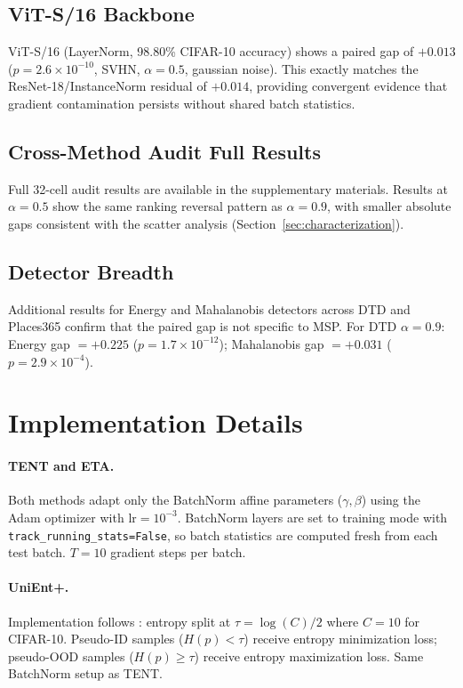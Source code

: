 \subsection{ViT-S/16 Backbone}

ViT-S/16 (LayerNorm, 98.80\% CIFAR-10 accuracy) shows a paired gap of $+0.013$ ($p = 2.6 \times 10^{-10}$, SVHN, $\alpha=0.5$, gaussian noise).
This exactly matches the ResNet-18/InstanceNorm residual of $+0.014$, providing convergent evidence that gradient contamination persists without shared batch statistics.

\subsection{Cross-Method Audit Full Results}

Full 32-cell audit results are available in the supplementary materials.
Results at $\alpha = 0.5$ show the same ranking reversal pattern as $\alpha = 0.9$, with smaller absolute gaps consistent with the scatter analysis (Section~\ref{sec:characterization}).

\subsection{Detector Breadth}

Additional results for Energy and Mahalanobis detectors across DTD and Places365 confirm that the paired gap is not specific to MSP.
For DTD $\alpha = 0.9$: Energy gap $= +0.225$ ($p = 1.7 \times 10^{-12}$); Mahalanobis gap $= +0.031$ ($p = 2.9 \times 10^{-4}$).

\section{Implementation Details}
\label{sec:appendix_impl}

\paragraph{TENT and ETA.}
Both methods adapt only the BatchNorm affine parameters ($\gamma, \beta$) using the Adam optimizer with $\text{lr} = 10^{-3}$.
BatchNorm layers are set to training mode with \texttt{track\_running\_stats=False}, so batch statistics are computed fresh from each test batch.
$T = 10$ gradient steps per batch.

\paragraph{UniEnt+.}
Implementation follows \citet{unient}: entropy split at $\tau = \log(C)/2$ where $C = 10$ for CIFAR-10.
Pseudo-ID samples ($H(p) < \tau$) receive entropy minimization loss; pseudo-OOD samples ($H(p) \ge \tau$) receive entropy maximization loss.
Same BatchNorm setup as TENT.

